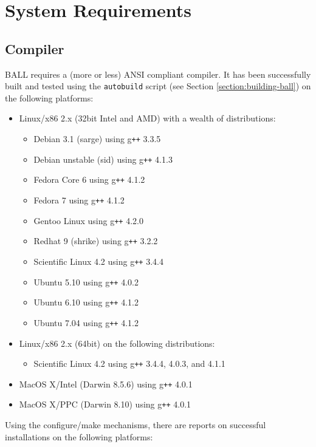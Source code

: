 \section{System Requirements}
\label{requirements}

\subsection{Compiler}
BALL requires a (more or less) ANSI compliant \CPP compiler. It has been 
successfully built and tested using the {\tt autobuild} script (see Section 
\ref{section:building-ball}) on the following platforms:
\begin{itemize}	
  \item Linux/x86 2.x (32bit Intel and AMD) with a wealth of distributions:
    \begin{itemize}
      \item Debian 3.1 (sarge) using g{\tt ++} 3.3.5
      \item Debian unstable (sid) using g{\tt ++} 4.1.3
      \item Fedora Core 6 using g{\tt ++} 4.1.2
      \item Fedora 7 using g{\tt ++} 4.1.2
      \item Gentoo Linux using g{\tt ++} 4.2.0
      \item Redhat 9 (shrike) using g{\tt ++} 3.2.2
      \item Scientific Linux 4.2 using g{\tt ++} 3.4.4
      \item Ubuntu 5.10 using g{\tt ++} 4.0.2
      \item Ubuntu 6.10 using g{\tt ++} 4.1.2
      \item Ubuntu 7.04 using g{\tt ++} 4.1.2
    \end{itemize}
  \item Linux/x86 2.x (64bit) on the following distributions:
    \begin{itemize}
      \item Scientific Linux 4.2 using g{\tt ++} 3.4.4, 4.0.3, and 4.1.1
    \end{itemize}
  \item MacOS X/Intel (Darwin 8.5.6) using g{\tt ++} 4.0.1
  \item MacOS X/PPC (Darwin 8.10) using g{\tt ++} 4.0.1
\end{itemize}

\noindent 
Using the configure/make mechanisms, there are reports on successful
installations on the following platforms:

